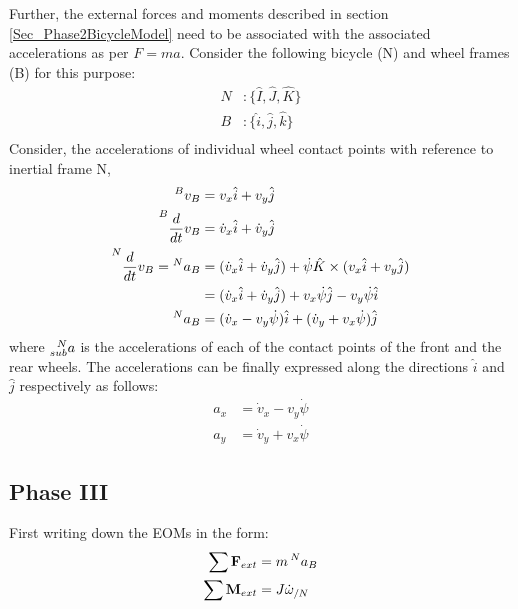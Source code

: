 Further, the external forces and moments described in section \ref{Sec_Phase2BicycleModel} need to be associated with the associated accelerations as per $F = ma$. Consider the following bicycle (N) and wheel frames (B) for this purpose:
\begin{align*}
	N &: \{\hat{I}, \hat{J}, \hat{K}\} \\
	B &: \{\hat{i}, \hat{j}, \hat{k}\} \\
\end{align*}
Consider, the accelerations of individual wheel contact points with reference to inertial frame N,
\begin{align*}
	\prescript{B}{}{v_B} &= v_x \hat{i} + v_y \hat{j} \\
	\prescript{B}{}{\frac{d}{dt}v_B} &= \dot{v}_x \hat{i} + \dot{v}_y \hat{j} \\
	\prescript{N}{}{\frac{d}{dt}v_B} = \prescript{N}{}{a_B} &= (\dot{v}_x \hat{i} + \dot{v}_y \hat{j}) + \dot{\psi} \hat{K} \times (v_x \hat{i} + v_y \hat{j}) \\
		&= (\dot{v}_x \hat{i} + \dot{v}_y \hat{j}) + v_x \dot{\psi} \hat{j} - v_y \dot{\psi} \hat{i} \\
	\prescript{N}{}{a_B} &= (\dot{v}_x - v_y \dot{\psi}) \hat{i} + (\dot{v}_y + v_x \dot{\psi}) \hat{j}
\end{align*}
where $\prescript{N}{sub}{a}$ is the accelerations of each of the contact points of the front and the rear wheels. The accelerations can be finally expressed along the directions $\hat{i}$  and $\hat{j}$ respectively as follows:
\begin{align}
	a_x &= \dot{v}_x - v_y \dot{\psi} \\
	a_y &= \dot{v}_y + v_x \dot{\psi}
\end{align}

\subsection{Phase III}

First writing down the EOMs in the form:
\begin{align*}
	\sum \vec{F}_{ext} &= m \prescript{N}{}{a}_{B} \\
	\sum \vec{M}_{ext} &= J \dot{\omega}_{/N} \\
\end{align*}

